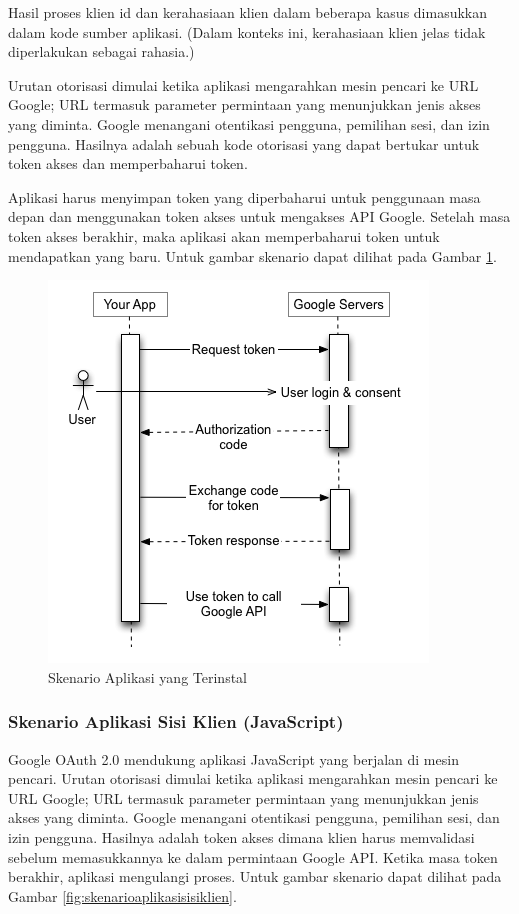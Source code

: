 Hasil proses klien id dan kerahasiaan klien dalam beberapa kasus dimasukkan dalam kode sumber aplikasi. (Dalam konteks ini, kerahasiaan klien jelas tidak diperlakukan sebagai rahasia.)

Urutan otorisasi dimulai ketika aplikasi mengarahkan mesin pencari ke URL Google; URL termasuk parameter permintaan yang menunjukkan jenis akses yang diminta. Google menangani otentikasi pengguna, pemilihan sesi, dan izin pengguna. Hasilnya adalah sebuah kode otorisasi yang dapat bertukar untuk token akses dan memperbaharui token.

Aplikasi harus menyimpan token yang diperbaharui untuk penggunaan masa depan dan menggunakan token akses untuk mengakses API Google. Setelah masa token akses berakhir, maka aplikasi akan memperbaharui token untuk mendapatkan yang baru. Untuk gambar skenario dapat dilihat pada Gambar \ref{fig:skenarioaplikasiyangterinstal}.

\begin{figure}[H]
\centering
\includegraphics[scale=1]{Gambar/skenario1.png}
\caption[Gambar Skenario Aplikasi yang Terinstal]{Skenario Aplikasi yang Terinstal} 
\label{fig:skenarioaplikasiyangterinstal}
\end{figure}

\subsubsection{Skenario Aplikasi Sisi Klien (JavaScript)}
Google OAuth 2.0 mendukung aplikasi JavaScript yang berjalan di mesin pencari. Urutan otorisasi dimulai ketika aplikasi mengarahkan mesin pencari ke URL Google; URL termasuk parameter permintaan yang menunjukkan jenis akses yang diminta. Google menangani otentikasi pengguna, pemilihan sesi, dan izin pengguna. Hasilnya adalah token akses dimana klien harus memvalidasi sebelum memasukkannya ke dalam permintaan Google API. Ketika masa token berakhir, aplikasi mengulangi proses. Untuk gambar skenario dapat dilihat pada Gambar \ref{fig:skenarioaplikasisisiklien}.

